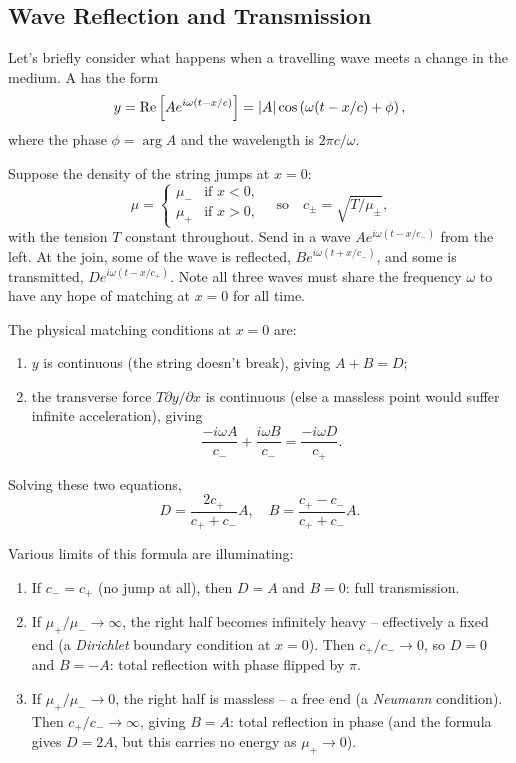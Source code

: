 \documentclass[a4paper]{scrartcl}
\begin{document}
\subsection{Wave Reflection and Transmission}

Let's briefly consider what happens when a travelling wave meets a change in the medium. A  has the form
$$
y = \operatorname{Re}\left[A e^{i \omega (t - x/c)}\right] = \lvert A\rvert \cos\left(\omega(t - x/c) + \phi\right),
$$
where the phase $\phi = \arg A$ and the wavelength is $2 \pi c / \omega$.

Suppose the density of the string jumps at $x = 0$:
$$
\mu = \begin{cases}
    \mu_- &\mbox{if } x < 0, \\
    \mu_+ &\mbox{if } x > 0,
\end{cases}
\quad \text{so} \quad
c_\pm = \sqrt{T / \mu_\pm},
$$
with the tension $T$ constant throughout. Send in a wave $A e^{i \omega (t - x/c_-)}$ from the left. At the join, some of the wave is reflected, $B e^{i \omega (t + x /c_-)}$, and some is transmitted, $D e^{i \omega (t - x/c_+)}$. Note all three waves must share the frequency $\omega$ to have any hope of matching at $x = 0$ for all time.

The physical matching conditions at $x = 0$ are:
\begin{enumerate}[label=(\roman*)]
    \item $y$ is continuous (the string doesn't break), giving $A + B = D$;
    \item the transverse force $T \partial y/\partial x$ is continuous (else a massless point would suffer infinite acceleration), giving
    $$
    \frac{-i \omega A}{c_-} + \frac{i \omega B}{c_-} = \frac{-i \omega D}{c_+}.
    $$
\end{enumerate}
Solving these two equations,
$$
D = \frac{2 c_+}{c_+ + c_-} A, \quad B = \frac{c_+ - c_-}{c_+ + c_-} A.
$$

Various limits of this formula are illuminating:
\begin{enumerate}[label=(\roman*)]
    \item If $c_- = c_+$ (no jump at all), then $D = A$ and $B = 0$: full transmission.
    \item If $\mu_+/\mu_- \rightarrow \infty$, the right half becomes infinitely heavy -- effectively a fixed end (a \emph{Dirichlet} boundary condition at $x = 0$). Then $c_+/c_- \rightarrow 0$, so $D = 0$ and $B = -A$: total reflection with phase flipped by $\pi$.
    \item If $\mu_+ / \mu_- \rightarrow 0$, the right half is massless -- a free end (a \emph{Neumann} condition). Then $c_+ / c_- \rightarrow \infty$, giving $B = A$: total reflection in phase (and the formula gives $D = 2A$, but this carries no energy as $\mu_+ \to 0$).
\end{enumerate}
\end{document}
